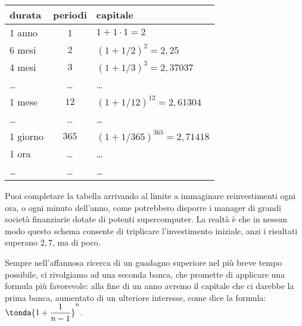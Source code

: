 \noindent\begin{minipage}{0.53\textwidth}
\begin{center}
   \begin{tabular}{l|c|l}
    durata & periodi  & capitale \\
    \hline
     1 anno& 1 & \(1+1\cdot1=2\) \\
     6 mesi  & \(2\) & \((1+1/2)^2=2,25\) \\
     4 mesi  & \(3\) &  \((1+1/3)^3=2,37037\) \\ 
     \dots & \dots & \dots \\
     1 mese  & \(12\) &  \((1+1/12)^{12}=2,61304\) \\
    \dots & \dots & \dots \\
     1 giorno &\(365\) &  \((1+1/365)^{365}=2,71418\)\\ 
     1 ora & \dots & \dots \\
     \dots & \dots & \dots \\
   \end{tabular}
\end{center}
\end{minipage}
\hfill
\begin{minipage}{0.45\textwidth}
\vspace{3mm}
Puoi completare la tabella arrivando al limite a immaginare reinvestimenti 
ogni ora, o ogni minuto dell'anno, come potrebbero disporre i manager di 
grandi società finanziarie dotate di potenti supercomputer. La realtà è che in 
nessun modo questo schema consente di triplicare l'investimento iniziale, anzi 
i risultati superano \(2,7\), ma di poco. 
\end{minipage}

Sempre nell'affannosa ricerca di un guadagno superiore nel più breve tempo 
possibile, ci rivolgiamo ad una seconda banca, che promette di applicare una 
formula più favorevole: alla fine di un anno avremo il capitale che ci darebbe 
la prima banca, aumentato di un ulteriore interesse, come dice la formula: 
\(\tonda{1+\dfrac{1}{n-1}}^n\). 

